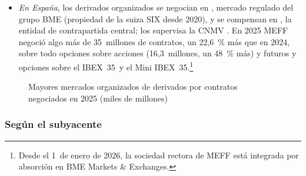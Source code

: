 \documentclass[11pt]{article}
\begin{document}
\begin{itemize}
\item \emph{En España}, los derivados organizados se negocian en , mercado regulado del grupo BME (propiedad de la suiza SIX desde 2020), y se compensan en , la entidad de contrapartida central; los supervisa la CNMV\nocite{CNMV2026RegistroMercados,SIX2020BME} . En 2025 MEFF negoció algo más de 35~millones de contratos, un 22,6~\% más que en 2024, sobre todo opciones sobre acciones (16,3~millones, un 48~\% más) y futuros y opciones sobre el IBEX~35~y el Mini IBEX~35\nocite{BME2026InformeMercado}.\footnote{Desde el 1~de enero de 2026, la sociedad rectora de MEFF está integrada por absorción en BME Markets \& Exchanges\nocite{CNMV2026RegistroMercados}.}
\end{itemize}

\begin{figure}[tbp]
\centering
\caption{Mayores mercados organizados de derivados por contratos negociados en 2025 (miles de millones)}\label{fig:fia-bolsas}
\end{figure}


\subsubsection{Según el subyacente}\label{sec:futuros-subyacente}
\end{document}
